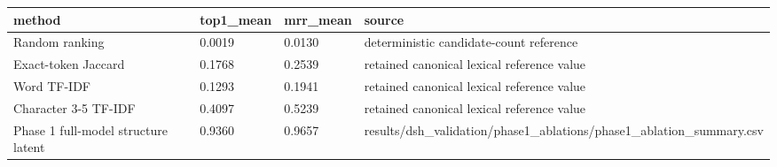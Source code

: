 \begin{tabular}{llll}
 \hline
method & top1\_mean & mrr\_mean & source \\
 \hline
Random ranking & 0.0019 & 0.0130 & deterministic candidate-count reference \\
Exact-token Jaccard & 0.1768 & 0.2539 & retained canonical lexical reference value \\
Word TF-IDF & 0.1293 & 0.1941 & retained canonical lexical reference value \\
Character 3-5 TF-IDF & 0.4097 & 0.5239 & retained canonical lexical reference value \\
Phase 1 full-model structure latent & 0.9360 & 0.9657 & results/dsh\_validation/phase1\_ablations/phase1\_ablation\_summary.csv \\
 \hline
\end{tabular}
